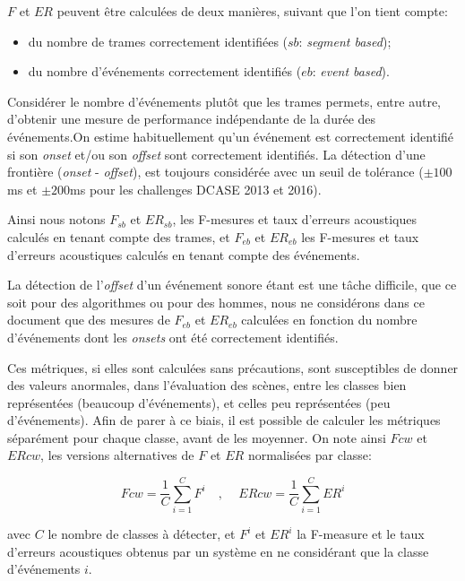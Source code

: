 $F$ et $ER$ peuvent être calculées de deux manières, suivant que l'on tient compte: 

\begin{itemize}
\item du nombre de trames correctement identifiées ($sb$: \emph{segment based});
\item du nombre d'événements correctement identifiés ($eb$: \emph{event based}).
\end{itemize}

Considérer le nombre d'événements plutôt que les trames permets, entre autre, d'obtenir une mesure de performance indépendante de la durée des événements.On estime habituellement qu'un événement est correctement identifié si son \emph{onset} et/ou son \emph{offset} sont correctement identifiés. La détection d'une frontière (\emph{onset} - \emph{offset}), est toujours considérée avec un seuil de tolérance ($\pm100$ms et $\pm200$ms pour les challenges DCASE 2013 et 2016).

Ainsi nous notons $F_{sb}$ et $ER_{sb}$, les F-mesures et taux d'erreurs acoustiques calculés en tenant compte des trames, et $F_{eb}$ et $ER_{eb}$ les F-mesures et taux d'erreurs acoustiques calculés en tenant compte des événements.

La détection de l'\emph{offset} d'un événement sonore étant est une tâche difficile, que ce soit pour des algorithmes ou pour des hommes, nous ne considérons dans ce document que des mesures de $F_{eb}$ et $ER_{eb}$ calculées en fonction du nombre d'événements dont les \emph{onsets} ont été correctement identifiés.

Ces métriques, si elles sont calculées sans précautions, sont susceptibles de donner des valeurs anormales, dans l'évaluation des scènes, entre les classes bien représentées (beaucoup d'événements), et celles peu représentées (peu d'événements). Afin de parer à ce biais, il est possible de calculer les métriques séparément pour chaque classe, avant de les moyenner. On note ainsi $Fcw$ et $ERcw$, les versions alternatives de $F$ et $ER$ normalisées par classe:

\begin{equation}
\label{eq:ch7_eq3}
Fcw=\dfrac{1}{C}\sum_{i=1}^C F^i \quad \textrm{, } \quad ERcw=\dfrac{1}{C}\sum_{i=1}^C ER^i
\end{equation}

avec $C$ le nombre de classes à détecter, et $F^i$ et $ER^i$ la F-measure et le taux d'erreurs acoustiques obtenus par un système en ne considérant que la classe d'événements $i$. 

